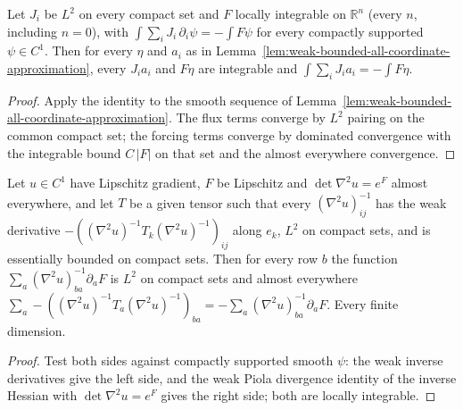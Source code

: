 \begin{lemma}
  \label{lem:weak-bounded-test-extension}
  \leanok
  Let $J_i$ be $L^2$ on every compact set and $F$ locally integrable on $\mathbb R^n$ (every $n$, including $n=0$), with
  $\int\sum_iJ_i\,\partial_i\psi=-\int F\psi$ for every compactly supported $\psi\in C^1$. Then for every $\eta$ and $a_i$ as in
  Lemma~\ref{lem:weak-bounded-all-coordinate-approximation}, every $J_ia_i$ and $F\eta$ are integrable and
  $\int\sum_iJ_ia_i=-\int F\eta$.
\end{lemma}
\begin{proof}
  \leanok
  Apply the identity to the smooth sequence of Lemma~\ref{lem:weak-bounded-all-coordinate-approximation}. The flux terms converge by
  $L^2$ pairing on the common compact set; the forcing terms converge by dominated convergence with the integrable bound
  $C\,|F|$ on that set and the almost everywhere convergence.
\end{proof}

\begin{lemma}
  \label{lem:weak-inverse-hessian-row-divergence}
  \leanok
  Let $u\in C^1$ have Lipschitz gradient, $F$ be Lipschitz and $\det\nabla^2u=e^{F}$ almost everywhere, and let $T$ be a given tensor
  such that every $(\nabla^2u)^{-1}_{ij}$ has the weak derivative $-((\nabla^2u)^{-1}T_k(\nabla^2u)^{-1})_{ij}$ along $e_k$, $L^2$ on
  compact sets, and is essentially bounded on compact sets. Then for every row $b$ the function
  $\sum_a(\nabla^2u)^{-1}_{ba}\partial_aF$ is $L^2$ on compact sets and almost everywhere
  $\sum_a-((\nabla^2u)^{-1}T_a(\nabla^2u)^{-1})_{ba}=-\sum_a(\nabla^2u)^{-1}_{ba}\partial_aF$. Every finite dimension.
\end{lemma}
\begin{proof}
  \leanok
  Test both sides against compactly supported smooth $\psi$: the weak inverse derivatives give the left side, and the weak Piola
  divergence identity of the inverse Hessian with $\det\nabla^2u=e^F$ gives the right side; both are locally integrable.
\end{proof}

